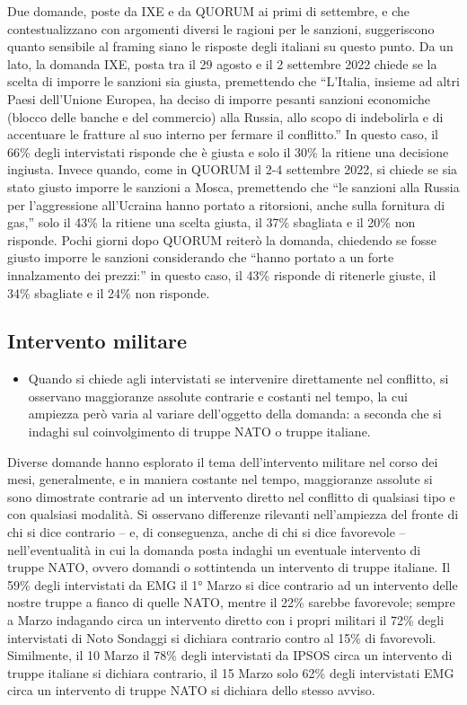 \documentclass[
]{book}
\providecommand{\tightlist}{%
  \setlength{\itemsep}{0pt}\setlength{\parskip}{0pt}}
\begin{document}
Due domande, poste da IXE e da QUORUM ai primi di settembre, e che contestualizzano con argomenti diversi le ragioni per le sanzioni, suggeriscono quanto sensibile al framing siano le risposte degli italiani su questo punto. Da un lato, la domanda IXE, posta tra il 29 agosto e il 2 settembre 2022 chiede se la scelta di imporre le sanzioni sia giusta, premettendo che ``L'Italia, insieme ad altri Paesi dell'Unione Europea, ha deciso di imporre pesanti sanzioni economiche (blocco delle banche e del commercio) alla Russia, allo scopo di indebolirla e di accentuare le fratture al suo interno per fermare il conflitto.'' In questo caso, il 66\% degli intervistati risponde che è giusta e solo il 30\% la ritiene una decisione ingiusta. Invece quando, come in QUORUM il 2-4 settembre 2022, si chiede se sia stato giusto imporre le sanzioni a Mosca, premettendo che ``le sanzioni alla Russia per l'aggressione all'Ucraina hanno portato a ritorsioni, anche sulla fornitura di gas,'' solo il 43\% la ritiene una scelta giusta, il 37\% sbagliata e il 20\% non risponde. Pochi giorni dopo QUORUM reiterò la domanda, chiedendo se fosse giusto imporre le sanzioni considerando che ``hanno portato a un forte innalzamento dei prezzi:'' in questo caso, il 43\% risponde di ritenerle giuste, il 34\% sbagliate e il 24\% non risponde.

\hypertarget{intervento-militare}{%
\subsection{Intervento militare}\label{intervento-militare}}

\begin{itemize}
\tightlist
\item
  Quando si chiede agli intervistati se intervenire direttamente nel conflitto, si osservano maggioranze assolute contrarie e costanti nel tempo, la cui ampiezza però varia al variare dell'oggetto della domanda: a seconda che si indaghi sul coinvolgimento di truppe NATO o truppe italiane.
\end{itemize}

Diverse domande hanno esplorato il tema dell'intervento militare nel corso dei mesi, generalmente, e in maniera costante nel tempo, maggioranze assolute si sono dimostrate contrarie ad un intervento diretto nel conflitto di qualsiasi tipo e con qualsiasi modalità. Si osservano differenze rilevanti nell'ampiezza del fronte di chi si dice contrario -- e, di conseguenza, anche di chi si dice favorevole -- nell'eventualità in cui la domanda posta indaghi un eventuale intervento di truppe NATO, ovvero domandi o sottintenda un intervento di truppe italiane. Il 59\% degli intervistati da EMG il 1° Marzo si dice contrario ad un intervento delle nostre truppe a fianco di quelle NATO, mentre il 22\% sarebbe favorevole; sempre a Marzo indagando circa un intervento diretto con i propri militari il 72\% degli intervistati di Noto Sondaggi si dichiara contrario contro al 15\% di favorevoli.
Similmente, il 10 Marzo il 78\% degli intervistati da IPSOS circa un intervento di truppe italiane si dichiara contrario, il 15 Marzo solo 62\% degli intervistati EMG circa un intervento di truppe NATO si dichiara dello stesso avviso.
\end{document}
